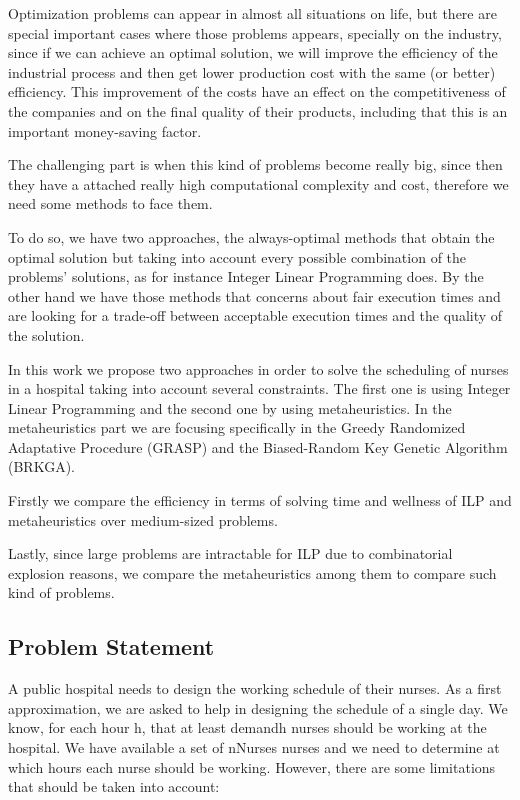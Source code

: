 Optimization problems can appear in almost all situations on life, but there are special important cases where those problems appears, specially on the industry, since if we can achieve an optimal solution, we will improve the efficiency of the industrial process and then get lower production cost with the same (or better) efficiency. This improvement of the costs have an effect on the competitiveness of the companies and on the final quality of their products, including that this is an important money-saving factor. 
   
   The challenging part is when this kind of problems become really big, since then they have a attached really high computational complexity and cost, therefore we need some methods to face them. 
   
   To do so, we have two approaches, the always-optimal methods that obtain the optimal solution but taking into account every possible combination of the problems' solutions, as for instance Integer Linear Programming does. By the other hand we have those methods that concerns about fair execution times and are looking for a trade-off between acceptable execution times and the quality of the solution.
   
   In this work we propose two approaches in order to solve the scheduling of nurses in a hospital taking into account several constraints. The first one is using Integer Linear Programming and the second one by using metaheuristics. In the metaheuristics part we are focusing specifically in the Greedy Randomized Adaptative Procedure (GRASP) and the Biased-Random Key Genetic Algorithm (BRKGA).
   
   Firstly we compare the efficiency in terms of solving time and wellness of ILP and metaheuristics over medium-sized problems. 
   
   Lastly, since large problems are intractable for ILP due to combinatorial explosion reasons, we compare the metaheuristics among them to compare such kind of problems.
   
   \subsection{Problem Statement}
   
   A public hospital needs to design the working schedule of their nurses. As a first approximation, we are asked to help in designing the schedule of a single day. We know, for each hour h, that at least demandh nurses should be working at the hospital. We have available a set of nNurses nurses and we need to determine at which hours each nurse should be working. However, there are some limitations that should be taken into account:
   
